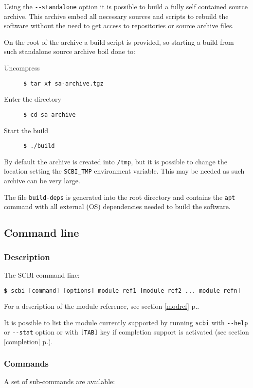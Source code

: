\documentclass[a4paper,12pt,twoside]{article}
\newcommand{\code}[1]{\texttt{#1}}
\newcommand{\seeref}[1]{see section \ref{#1} p.\pageref{#1}}
\newcommand{\cmd}[1]{\tabto{1cm}\hspace{0.5cm}\texttt{\textbf{\$} #1}}
\newcommand{\ddash}{-{}-}
\begin{document}
Using the \code{\ddash{}standalone} option it is possible to build a fully self contained source archive. This archive embed all necessary sources and scripts to rebuild the software without the need to get access to repositories or source archive files.

On the root of the archive a build script is provided, so starting a build from such standalone source archive boil done to:

\begin{description}
	\item[Uncompress] \cmd{tar xf sa-archive.tgz}
	\item[Enter the directory] \cmd{cd sa-archive}
	\item[Start the build] \cmd{./build}
\end{description}

By default the archive is created into \code{/tmp}, but it is possible to change the location setting the \code{SCBI\_TMP} environment variable. This may be needed as such archive can be very large.

The file \code{build-deps} is generated into the root directory and contains the \code{apt} command with all external (OS) dependencies needed to build the software.

\subsection{Command line}

\subsubsection{Description}

The SCBI command line:

\cmd{scbi [command] [options] module-ref1 [module-ref2 ... module-refn]}

For a description of the module reference, \seeref{modref}.

It is possible to list the module currently supported by running \code{scbi} with \code{\ddash{}help} or \code{\ddash{}stat} option or with \code{[TAB]} key if completion support is activated (\seeref{completion}).

\subsubsection{Commands}
\label{cmdline}

A set of sub-commands are available:
\end{document}
